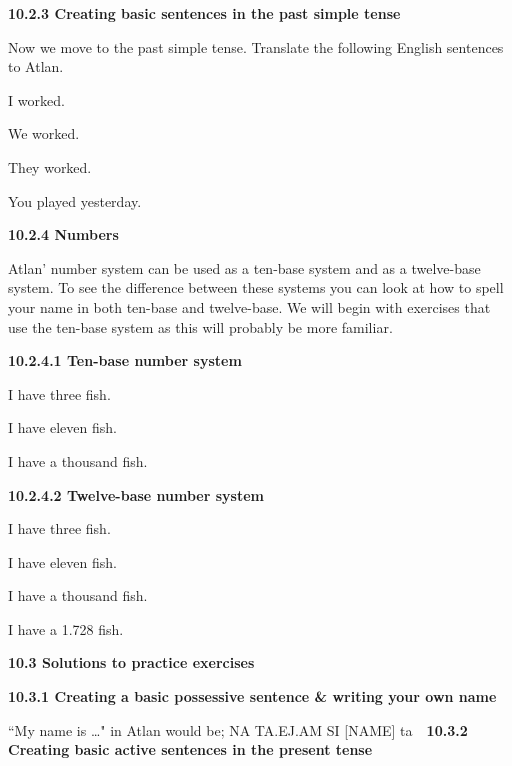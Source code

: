 \noindent \textbf{10.2.3 Creating basic sentences in the past simple tense} 

Now we move to the past simple tense. Translate the following English sentences to Atlan. 

    I worked. 

    We worked. 

    They worked. 

    You played yesterday. 

 

 

 

\noindent \textbf{10.2.4 Numbers} 

Atlan’ number system can be used as a ten-base system and as a twelve-base system. To see the difference between these systems you can look at how to spell your name in both ten-base and twelve-base. We will begin with exercises that use the ten-base system as this will probably be more familiar. 

\noindent \textbf{10.2.4.1 Ten-base number system} 

    I have three fish. 

    I have eleven fish. 

    I have a thousand fish. 

\noindent \textbf{10.2.4.2 Twelve-base number system} 

    I have three fish. 

    I have eleven fish. 

    I have a thousand fish. 

    I have a 1.728 fish.  

 

 

 

 

 

 

 

 

 

\noindent \textbf{10.3 Solutions to practice exercises} 

\noindent \textbf{10.3.1 Creating a basic possessive sentence \& writing your own name} 

 “My name is …" in Atlan would be; NA TA.EJ.AM SI [NAME] \na ta\ej\am \si {}. 

 

\noindent \textbf{10.3.2 Creating basic active sentences in the present tense} 

